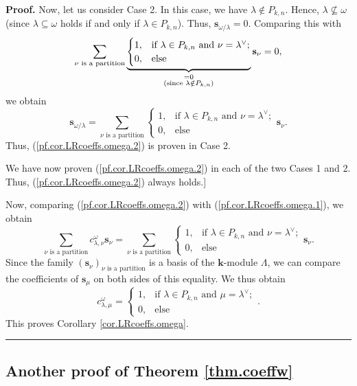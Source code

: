 \documentclass[numbers=enddot,12pt,final,onecolumn,notitlepage]{scrartcl}%
\theoremstyle{definition}
\newenvironment{proof}[1][Proof]{\noindent\textbf{#1.} }{\ \rule{0.5em}{0.5em}}
\let\sumnonlimits\sum
\renewcommand{\sum}{\sumnonlimits\limits}
\begin{document}
\begin{proof}
Now, let us consider Case 2. In this case, we have $\lambda\notin P_{k,n}$.
Hence, $\lambda\not \subseteq \omega$ (since $\lambda\subseteq\omega$ holds if
and only if $\lambda\in P_{k,n}$). Thus, $\mathbf{s}_{\omega/\lambda}=0$.
Comparing this with%
\[
\sum_{\nu\text{ is a partition}}\underbrace{%
\begin{cases}
1, & \text{if }\lambda\in P_{k,n}\text{ and }\nu=\lambda^{\vee};\\
0, & \text{else}%
\end{cases}
}_{\substack{=0\\\text{(since }\lambda\notin P_{k,n}\text{)}}}\mathbf{s}_{\nu
}=0,
\]
we obtain%
\[
\mathbf{s}_{\omega/\lambda}=\sum_{\nu\text{ is a partition}}%
\begin{cases}
1, & \text{if }\lambda\in P_{k,n}\text{ and }\nu=\lambda^{\vee};\\
0, & \text{else}%
\end{cases}
\mathbf{s}_{\nu}.
\]
Thus, (\ref{pf.cor.LRcoeffs.omega.2}) is proven in Case 2.

We have now proven (\ref{pf.cor.LRcoeffs.omega.2}) in each of the two Cases 1
and 2. Thus, (\ref{pf.cor.LRcoeffs.omega.2}) always holds.]

Now, comparing (\ref{pf.cor.LRcoeffs.omega.2}) with
(\ref{pf.cor.LRcoeffs.omega.1}), we obtain%
\[
\sum_{\nu\text{ is a partition}}c_{\lambda,\nu}^{\omega}\mathbf{s}_{\nu}%
=\sum_{\nu\text{ is a partition}}%
\begin{cases}
1, & \text{if }\lambda\in P_{k,n}\text{ and }\nu=\lambda^{\vee};\\
0, & \text{else}%
\end{cases}
\mathbf{s}_{\nu}.
\]
Since the family $\left(  \mathbf{s}_{\nu}\right)  _{\nu\text{ is a
partition}}$ is a basis of the $\mathbf{k}$-module $\Lambda$, we can compare
the coefficients of $\mathbf{s}_{\mu}$ on both sides of this equality. We thus
obtain%
\[
c_{\lambda,\mu}^{\omega}=%
\begin{cases}
1, & \text{if }\lambda\in P_{k,n}\text{ and }\mu=\lambda^{\vee};\\
0, & \text{else}%
\end{cases}
.
\]
This proves Corollary \ref{cor.LRcoeffs.omega}.
\end{proof}

\subsection{Another proof of Theorem \ref{thm.coeffw}}
\end{document}
